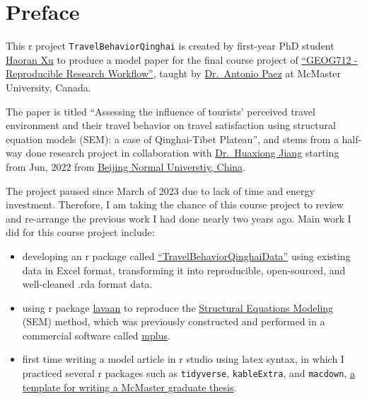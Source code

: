 \documentclass[
11pt, %
oneside, %
english, %
singlespacing, %
]{macthesis} %
\def\tightlist{}
\begin{document}

\mainmatter %
\pagestyle{thesis}
\chapter*{Preface}\label{preface}

This r project \texttt{TravelBehaviorQinghai} is created by first-year PhD student \href{https://github.com/Horan517}{Haoran Xu} to produce a model paper for the final course project of \href{https://github.com/paezha/Reproducible-Research-Workflow/tree/master}{``GEOG712 - Reproducible Research Workflow''}, taught by \href{https://experts.mcmaster.ca/display/paezha}{Dr.~Antonio Paez} at McMaster University, Canada.

The paper is titled ``Assessing the influence of tourists' perceived travel environment and their travel behavior on travel satisfaction using structural equation models (SEM): a case of Qinghai-Tibet Plateau'', and stems from a half-way done research project in collaboration with \href{https://www.researchgate.net/scientific-contributions/Huaxiong-Jiang-2157090528}{Dr.~Huaxiong Jiang} starting from Jun, 2022 from \href{https://english.bnu.edu.cn/}{Beijing Normal Universtiy, China}.

The project paused since March of 2023 due to lack of time and energy investment. Therefore, I am taking the chance of this course project to review and re-arrange the previous work I had done nearly two years ago. Main work I did for this course project include:

\begin{itemize}
\tightlist
\item
  developing an r package called \href{https://github.com/Horan517/TravelBehaviorQinghaiData}{``TravelBehaviorQinghaiData''} using existing data in Excel format, transforming it into reproducible, open-sourced, and well-cleaned .rda format data.
\item
  using r package \href{https://lavaan.ugent.be/}{lavaan} to reproduce the \href{https://en.wikipedia.org/wiki/Structural_equation_modeling}{Structural Equations Modeling} (SEM) method, which was previously constructed and performed in a commercial software called \href{https://www.statmodel.com/}{mplus}.
\item
  first time writing a model article in r studio using latex syntax, in which I practiced several r packages such as \texttt{tidyverse}, \texttt{kableExtra}, and \texttt{macdown}, \href{https://github.com/paezha/macdown?tab=readme-ov-file}{a template for writing a McMaster graduate thesis}.
\end{itemize}
\end{document}
